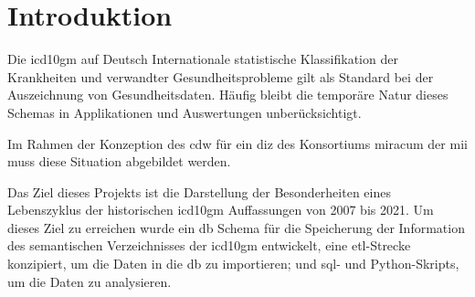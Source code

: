 \chapter{Introduktion} \label{ch:introduction}

	Die \ac{icd10gm} auf Deutsch Internationale statistische Klassifikation der Krankheiten und  verwandter Gesundheitsprobleme gilt als Standard bei der Auszeichnung von Gesundheitsdaten. Häufig bleibt die temporäre Natur dieses Schemas in Applikationen und Auswertungen unberücksichtigt.
	
	Im Rahmen der Konzeption des \ac{cdw} für ein  \ac{diz} des Konsortiums \ac{miracum} der \ac{mii} muss diese Situation abgebildet werden.%
	
	Das Ziel dieses Projekts ist die Darstellung der Besonderheiten eines Lebenszyklus der historischen \ac{icd10gm} Auffassungen von 2007 bis 2021. Um dieses Ziel zu erreichen wurde ein \ac{db} Schema für die Speicherung der Information des semantischen Verzeichnisses der \ac{icd10gm} entwickelt, eine \ac{etl}-Strecke konzipiert, um die Daten in die \ac{db} zu importieren; und \ac{sql}- und Python-Skripts, um die Daten zu analysieren.
	